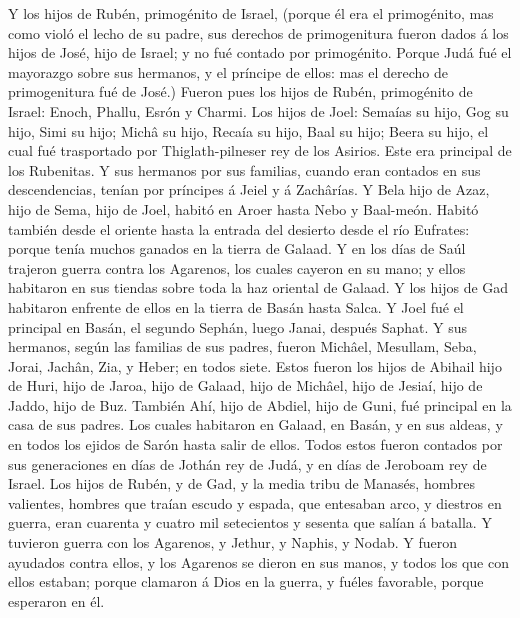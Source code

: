  Y los hijos de Rubén, primogénito de Israel, (porque él era
el primogénito, mas como violó el lecho de su padre, sus derechos de
primogenitura fueron dados á los hijos de José, hijo de Israel; y no fué
contado por primogénito.  Porque Judá fué el mayorazgo sobre
sus hermanos, y el príncipe de ellos: mas el derecho de primogenitura
fué de José.)  Fueron pues los hijos de Rubén, primogénito
de Israel: Enoch, Phallu, Esrón y Charmi.  Los hijos de
Joel: Semaías su hijo, Gog su hijo, Simi su hijo;  Michâ su
hijo, Recaía su hijo, Baal su hijo;  Beera su hijo, el cual
fué trasportado por Thiglath-pilneser rey de los Asirios. Este era
principal de los Rubenitas.  Y sus hermanos por sus
familias, cuando eran contados en sus descendencias, tenían por
príncipes á Jeiel y á Zachârías.  Y Bela hijo de Azaz, hijo
de Sema, hijo de Joel, habitó en Aroer hasta Nebo y Baal-meón.
 Habitó también desde el oriente hasta la entrada del
desierto desde el río Eufrates: porque tenía muchos ganados en la tierra
de Galaad.  Y en los días de Saúl trajeron guerra contra
los Agarenos, los cuales cayeron en su mano; y ellos habitaron en sus
tiendas sobre toda la haz oriental de Galaad.  Y los hijos
de Gad habitaron enfrente de ellos en la tierra de Basán hasta Salca.
 Y Joel fué el principal en Basán, el segundo Sephán, luego
Janai, después Saphat.  Y sus hermanos, según las familias
de sus padres, fueron Michâel, Mesullam, Seba, Jorai, Jachân, Zia, y
Heber; en todos siete.  Estos fueron los hijos de Abihail
hijo de Huri, hijo de Jaroa, hijo de Galaad, hijo de Michâel, hijo de
Jesiaí, hijo de Jaddo, hijo de Buz.  También Ahí, hijo de
Abdiel, hijo de Guni, fué principal en la casa de sus padres.
 Los cuales habitaron en Galaad, en Basán, y en sus aldeas,
y en todos los ejidos de Sarón hasta salir de ellos.  Todos
estos fueron contados por sus generaciones en días de Jothán rey de
Judá, y en días de Jeroboam rey de Israel.  Los hijos de
Rubén, y de Gad, y la media tribu de Manasés, hombres valientes, hombres
que traían escudo y espada, que entesaban arco, y diestros en guerra,
eran cuarenta y cuatro mil setecientos y sesenta que salían á batalla.
 Y tuvieron guerra con los Agarenos, y Jethur, y Naphis, y
Nodab.  Y fueron ayudados contra ellos, y los Agarenos se
dieron en sus manos, y todos los que con ellos estaban; porque clamaron
á Dios en la guerra, y fuéles favorable, porque esperaron en él.
